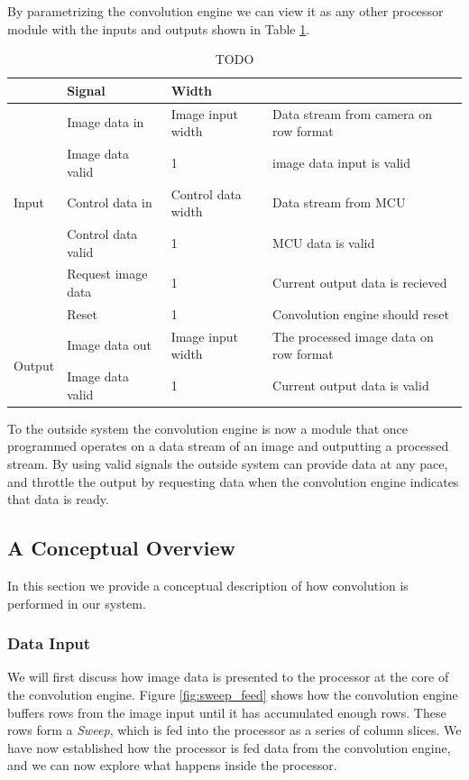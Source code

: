 By parametrizing the convolution engine we can view it as any other processor module with the inputs and outputs shown in Table \ref{tbl:ConvolutionEngineIO}.

\begin{table}[h]
    \begin{tabular}{l | l | l | l }
        &   Signal & Width\\
        \hline
        \multirow{5}{*}{Input}
        &   Image data in           & Image input width     & Data stream from camera on row format
        \\
        &   Image data valid        & 1                     & image data input is valid
        \\
        &   Control data in         & Control data width    & Data stream from MCU
        \\
        &   Control data valid      & 1                     & MCU data is valid
        \\
        &   Request image data      & 1                     & Current output data is recieved
        \\
        &   Reset                   & 1                     & Convolution engine should reset
        \\\hline
        \multirow{2}{*}{Output}
        &   Image data out          & Image input width     & The processed image data on row format\\
        &   Image data valid        & 1                     & Current output data is valid
    \end{tabular}
    \caption{TODO}
    \label{tbl:ConvolutionEngineIO}
\end{table}

To the outside system the convolution engine is now a module that once programmed operates on a data stream of an image and outputting a processed stream. 
By using valid signals the outside system can provide data at any pace, and throttle the output by requesting data when the convolution engine indicates that data is ready. 

\subsection{A Conceptual Overview}
In this section we provide a conceptual description of how convolution is performed in our system.

\subsubsection{Data Input}
We will first discuss how image data is presented to the processor at the core of the convolution engine.
Figure \ref{fig:sweep_feed} shows how the convolution engine buffers rows from the image input until it has accumulated enough rows.
These rows form a \textit{Sweep}, which is fed into the processor as a series of column slices.
We have now established how the processor is fed data from the convolution engine, and we can now explore what happens inside the processor.

